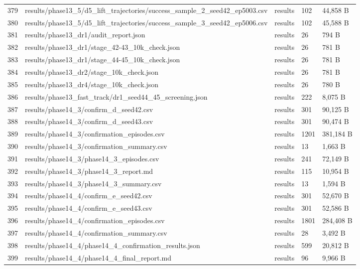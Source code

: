 \documentclass[11pt,a4paper,oneside]{book}
\begin{document}
\begin{longtable}{l l l l l}
379 & results/phase13\_5/d5\_lift\_trajectories/success\_sample\_2\_seed42\_ep5003.csv & results & 102 & 44,858 B \\
380 & results/phase13\_5/d5\_lift\_trajectories/success\_sample\_3\_seed42\_ep5006.csv & results & 102 & 45,588 B \\
381 & results/phase13\_dr1/audit\_report.json & results & 26 & 794 B \\
382 & results/phase13\_dr1/stage\_42-43\_10k\_check.json & results & 26 & 781 B \\
383 & results/phase13\_dr1/stage\_44-45\_10k\_check.json & results & 26 & 781 B \\
384 & results/phase13\_dr2/stage\_10k\_check.json & results & 26 & 781 B \\
385 & results/phase13\_dr4/stage\_10k\_check.json & results & 26 & 780 B \\
386 & results/phase13\_fast\_track/dr1\_seed44\_45\_screening.json & results & 222 & 8,075 B \\
387 & results/phase14\_3/confirm\_d\_seed42.csv & results & 301 & 90,125 B \\
388 & results/phase14\_3/confirm\_d\_seed43.csv & results & 301 & 90,474 B \\
389 & results/phase14\_3/confirmation\_episodes.csv & results & 1201 & 381,184 B \\
390 & results/phase14\_3/confirmation\_summary.csv & results & 13 & 1,663 B \\
391 & results/phase14\_3/phase14\_3\_episodes.csv & results & 241 & 72,149 B \\
392 & results/phase14\_3/phase14\_3\_report.md & results & 115 & 10,954 B \\
393 & results/phase14\_3/phase14\_3\_summary.csv & results & 13 & 1,594 B \\
394 & results/phase14\_4/confirm\_e\_seed42.csv & results & 301 & 52,670 B \\
395 & results/phase14\_4/confirm\_e\_seed43.csv & results & 301 & 52,586 B \\
396 & results/phase14\_4/confirmation\_episodes.csv & results & 1801 & 284,408 B \\
397 & results/phase14\_4/confirmation\_summary.csv & results & 28 & 3,492 B \\
398 & results/phase14\_4/phase14\_4\_confirmation\_results.json & results & 599 & 20,812 B \\
399 & results/phase14\_4/phase14\_4\_final\_report.md & results & 96 & 9,966 B \\

\end{longtable}
\end{document}
